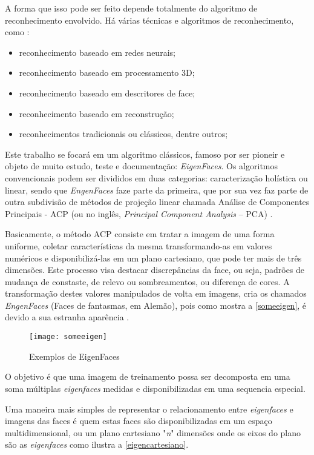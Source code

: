 A forma que isso pode ser feito depende totalmente do algoritmo de reconhecimento envolvido. Há várias técnicas e algoritmos de reconhecimento, como \cite{issues_methods_FR}:

\begin{itemize}
	\item reconhecimento baseado em redes neurais;
	\item reconhecimento baseado em processamento 3D;
	\item reconhecimento baseado em descritores de face;
	\item reconhecimento baseado em reconstrução;
	\item reconhecimentos tradicionais ou clássicos, dentre outros;
\end{itemize}

Este trabalho se focará em um algoritmo clássicos, famoso por ser pioneir e objeto de muito estudo, teste e documentação: \textit{EigenFaces}. Os algoritmos convencionais podem ser divididos em duas categorias: caracterização holística ou linear, sendo que \textit{EngenFaces} faze parte da primeira, que por sua vez faz parte de outra subdivisão de métodos de projeção linear chamada Análise de Componentes Principais - ACP (ou no inglês, \textit{Principal Component Analysis} – PCA) \cite{issues_methods_FR}.

Basicamente, o método ACP consiste em tratar a imagem de uma forma uniforme, coletar características da mesma transformando-as em valores numéricos e disponibilizá-las em um plano cartesiano, que pode ter mais de três dimensões. Este processo visa destacar discrepâncias da face, ou seja, padrões de mudança de constaste, de relevo ou sombreamentos, ou diferença de cores. A transformação destes valores manipulados de volta em imagens, cria os chamados \textit{EngenFaces} (Faces de fantasmas, em Alemão), pois como mostra a \autoref{someeigen}, é devido a sua estranha aparência \cite{drmathew_java_programming}.

\begin{figure}[h]
	\centering
	\texttt{[image: someeigen]}
	\caption{Exemplos de EigenFaces}
	\label{someeigen}
\end{figure}

O objetivo é que uma imagem de treinamento possa ser decomposta em uma soma múltiplas \textit{eigenfaces} medidas e disponibilizadas em uma sequencia especial.

Uma maneira mais simples de representar o relacionamento entre \textit{eigenfaces} e imagens das faces é quem estas faces são disponibilizadas em um espaço multidimensional, ou um plano cartesiano "\textit{n}" dimensões onde os eixos do plano são as \textit{eigenfaces} \cite{drmathew_java_programming} como ilustra a  \autoref{eigencartesiano}.


